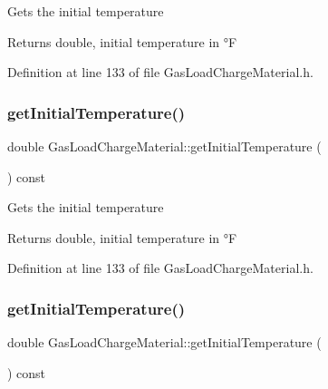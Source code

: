 Gets the initial temperature

\begin{DoxyReturn}{Returns}
double, initial temperature in °F 
\end{DoxyReturn}


Definition at line 133 of file Gas\+Load\+Charge\+Material.\+h.

\mbox{\label{class_gas_load_charge_material_af8a83c3720d108baa196394105822db7}} 
\subsubsection{\texorpdfstring{get\+Initial\+Temperature()}{getInitialTemperature()}\hspace{0.1cm}{\footnotesize\ttfamily [2/3]}}
{\footnotesize\ttfamily double Gas\+Load\+Charge\+Material\+::get\+Initial\+Temperature (\begin{DoxyParamCaption}{ }\end{DoxyParamCaption}) const\hspace{0.3cm}{\ttfamily [inline]}}

Gets the initial temperature

\begin{DoxyReturn}{Returns}
double, initial temperature in °F 
\end{DoxyReturn}


Definition at line 133 of file Gas\+Load\+Charge\+Material.\+h.

\mbox{\label{class_gas_load_charge_material_af8a83c3720d108baa196394105822db7}} 
\subsubsection{\texorpdfstring{get\+Initial\+Temperature()}{getInitialTemperature()}\hspace{0.1cm}{\footnotesize\ttfamily [3/3]}}
{\footnotesize\ttfamily double Gas\+Load\+Charge\+Material\+::get\+Initial\+Temperature (\begin{DoxyParamCaption}{ }\end{DoxyParamCaption}) const\hspace{0.3cm}{\ttfamily [inline]}}

